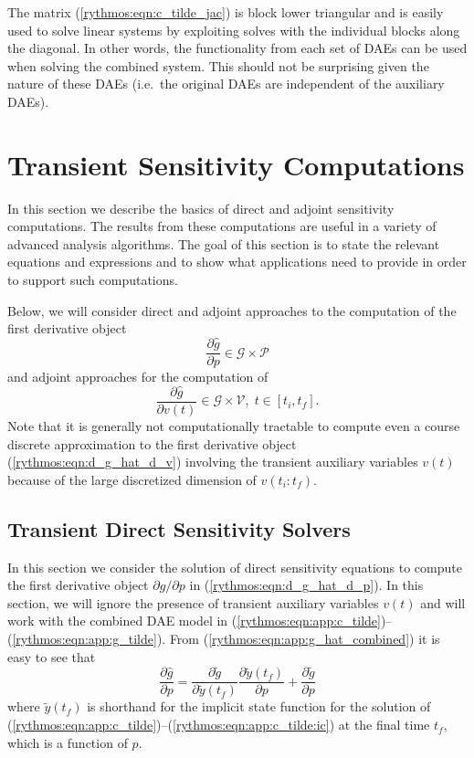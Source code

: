 \documentclass[pdf,ps2pdf,11pt]{SANDreport}
\begin{document}
The matrix (\ref{rythmos:eqn:c_tilde_jac}) is block lower triangular and is
easily used to solve linear systems by exploiting solves with the individual
blocks along the diagonal.  In other words, the functionality from each set of
DAEs can be used when solving the combined system.  This should not be
surprising given the nature of these DAEs (i.e.\ the original DAEs are
independent of the auxiliary DAEs).

\section{Transient Sensitivity Computations}

In this section we describe the basics of direct and adjoint sensitivity
computations.  The results from these computations are useful in a variety of
advanced analysis algorithms.  The goal of this section is to state the
relevant equations and expressions and to show what applications need to
provide in order to support such computations.

Below, we will consider direct and adjoint approaches to the computation of
the first derivative object
%
\begin{equation}
\frac{\partial \hat{g}}{\partial p} \in \mathcal{G} \times \mathcal{P}
\label{rythmos:eqn:d_g_hat_d_p}
\end{equation}
%
and adjoint approaches for the computation of
%
\begin{equation}
\frac{\partial \hat{g}}{\partial v(t)} \in \mathcal{G} \times \mathcal{V}, \; t \in [t_i,t_f].
\label{rythmos:eqn:d_g_hat_d_v}
\end{equation}
%
Note that it is generally not computationally tractable to compute even a
course discrete approximation to the first derivative object
(\ref{rythmos:eqn:d_g_hat_d_v}) involving the transient auxiliary variables
$v(t)$ because of the large discretized dimension of $v(t_i:t_f)$.

\subsection{Transient Direct Sensitivity Solvers}

In this section we consider the solution of direct sensitivity equations to
compute the first derivative object ${}\partial {}\hat{g} / {}\partial p$ in
(\ref{rythmos:eqn:d_g_hat_d_p}).  In this section, we will ignore the presence
of transient auxiliary variables $v(t)$ and will work with the combined DAE
model in (\ref{rythmos:eqn:app:c_tilde})--(\ref{rythmos:eqn:app:g_tilde}).
From (\ref{rythmos:eqn:app:g_hat_combined}) it is easy to see that
%
\begin{equation}
\frac{\partial \hat{g}}{\partial p}
= \frac{\partial \tilde{g}}{\partial \tilde{y}(t_f)} \frac{\partial \tilde{y}(t_f)}{\partial p} 
+ \frac{\partial \tilde{g}}{\partial p}
\label{rythmos:eqn:app:g_hat_direct}
\end{equation}
%
where $\tilde{y}(t_f)$ is shorthand for the implicit state function for the
solution of
(\ref{rythmos:eqn:app:c_tilde})--(\ref{rythmos:eqn:app:c_tilde:ic}) at the
final time $t_f$, which is a function of $p$.
\end{document}
